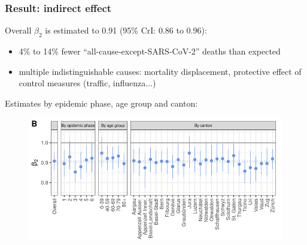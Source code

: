 \documentclass[10pt]{beamer}
\begin{document}
\begin{frame}
\frametitle{Result:  indirect effect}
        Overall $\beta_2$ is estimated to \alert{0.91 (95\% CrI: 0.86 to 0.96)}:
         \begin{itemize}
        	\item 4\% to 14\% fewer ``all-cause-except-SARS-CoV-2'' deaths than expected 
        	\item multiple indistinguishable causes: mortality \alert{displacement}, \alert{protective effect} of control measures (traffic, influenza...)
        \end{itemize}
        \bigskip
        Estimates by epidemic phase, age group and canton:
        
\begin{figure}[t]
	\includegraphics[width=.85\linewidth ]{beta2_fig}
\end{figure}
\end{frame}
\end{document}
